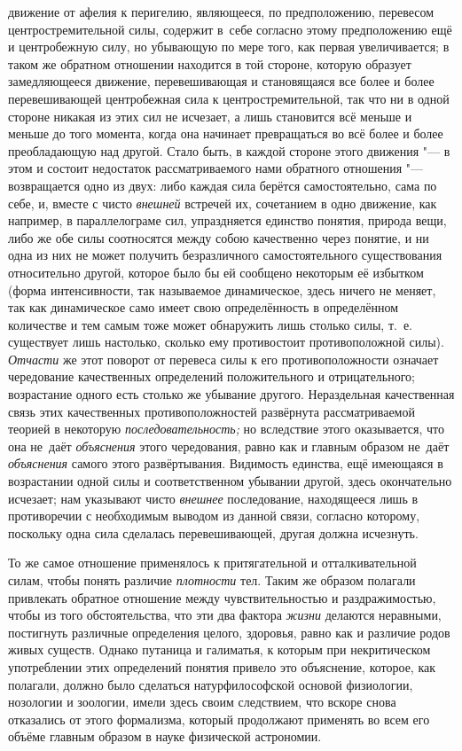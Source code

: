 движение от афелия к перигелию, являющееся, по предположению, перевесом
центростремительной силы, содержит в~себе согласно этому предположению ещё и
центробежную силу, но убывающую по мере того, как первая увеличивается; в таком
же обратном отношении находится в той стороне, которую образует замедляющееся
движение, перевешивающая и становящаяся все более и более перевешивающей
центробежная сила к центростремительной, так что ни в одной стороне никакая из
этих сил не исчезает, а лишь становится всё меньше и меньше до того момента,
когда она начинает превращаться во всё более и более преобладающую над другой.
Стало быть, в каждой стороне этого движения "--- в этом и состоит недостаток
рассматриваемого нами обратного отношения "--- возвращается одно из двух: либо
каждая сила берётся самостоятельно, сама по себе, и, вместе с чисто
{\em внешней} встречей их, сочетанием в одно движение, как например, в
параллелограме сил, упраздняется единство понятия, природа вещи, либо же обе
силы соотносятся между собою качественно через понятие, и ни одна из них не
может получить безразличного самостоятельного существования относительно
другой, которое было бы ей сообщено некоторым её избытком (форма интенсивности,
так называемое динамическое, здесь ничего не меняет, так как динамическое само
имеет свою определённость в определённом количестве и тем самым тоже может
обнаружить лишь столько силы, т.~е. существует лишь настолько, сколько ему
противостоит противоположной силы). {\em Отчасти} же этот поворот от перевеса
силы к его противоположности означает чередование качественных определений
положительного и отрицательного; возрастание одного есть столько же убывание
другого. Нераздельная качественная связь этих качественных противоположностей
развёрнута рассматриваемой теорией в некоторую {\em последовательность;} но
вследствие этого оказывается, что она не~даёт {\em объяснения} этого
чередования, равно как и главным образом не~даёт {\em объяснения} самого этого
развёртывания. Видимость единства, ещё имеющаяся в возрастании одной силы и
соответственном убывании другой, здесь окончательно исчезает; нам указывают
чисто {\em внешнее} последование, находящееся лишь в противоречии с необходимым
выводом из данной связи, согласно которому, поскольку одна сила сделалась
перевешивающей, другая должна исчезнуть.

То же самое отношение применялось к притягательной и отталкивательной силам,
чтобы понять различие {\em плотности} тел. Таким же образом полагали привлекать
обратное отношение между чувствительностью и раздражимостью, чтобы из того
обстоятельства, что эти два фактора {\em жизни} делаются неравными, постигнуть
различные определения целого, здоровья, равно как и различие родов живых
существ. Однако путаница и галиматья, к которым при некритическом употреблении
этих определений понятия привело это объяснение, которое, как полагали, должно
было сделаться натурфилософской основой физиологии, нозологии и зоологии, имели
здесь своим следствием, что вскоре снова отказались от этого формализма,
который продолжают применять во всем его объёме главным образом в науке
физической астрономии.

